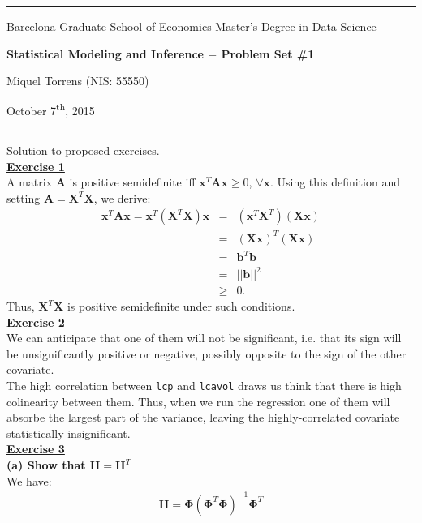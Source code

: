\documentclass[a4paper, 11pt]{article}
\newcommand{\header}[4]{
	\begin{center}
		\rule{\linewidth}{0.5pt}
		
		{\small{#1}}
      
        \vspace{0.2in}
        
		{\large{#2}}
		
        \vspace{0.2in}
        
		{\small{#3}}
		
		\vspace{0.15in}
		
		{#4}
		
		\vspace{-0.1in}
		\rule{\linewidth}{0.6pt}
	\end{center}
}
\begin{document}
 
\header{\sc Barcelona Graduate School of Economics \hfill Master's Degree in Data Science}{\bf Statistical Modeling and Inference $-$ Problem Set \#1}{\sc Miquel Torrens (NIS: 55550)}{October 7\textsuperscript{th}, 2015}
Solution to proposed exercises.\\
\newline \textbf{\underline{Exercise 1}}\\
\newline A matrix $\mathbf{A}$ is positive semidefinite iff $\mathbf{x}^T \mathbf{A} \mathbf{x} \geq 0$, $\forall \mathbf{x}$. Using this definition and setting $\mathbf{A} = \mathbf{X}^T \mathbf{X}$, we derive:
\begin{eqnarray}
\mathbf{x}^T \mathbf{A} \mathbf{x} = \mathbf{x}^T \left( \mathbf{X}^T \mathbf{X} \right) \mathbf{x} &=& \left( \mathbf{x}^T \mathbf{X}^T \right)  \left( \mathbf{X} \mathbf{x}  \right) \nonumber \\
&=& \left( \mathbf{X} \mathbf{x} \right)^T  \left( \mathbf{X} \mathbf{x}  \right) \nonumber \\
&=& \mathbf{b}^T \mathbf{b} \nonumber \\
&=& ||\mathbf{b}||^2 \nonumber \\
&\geq & 0. \nonumber
\end{eqnarray}
Thus, $ \mathbf{X}^T \mathbf{X}$ is positive semidefinite under such conditions.\\
\newline \textbf{\underline{Exercise 2}}\\
\newline We can anticipate that one of them will not be significant, i.e. that its sign will be unsignificantly positive or negative, possibly opposite to the sign of the other covariate.\\
\newline The high correlation between \texttt{lcp} and \texttt{lcavol} draws us think that there is high colinearity between them. Thus, when we run the regression one of them will absorbe the largest part of the variance, leaving the highly-correlated covariate statistically insignificant.\\
\newline \textbf{\underline{Exercise 3}}\\
\newline \textbf{(a) Show that $\mathbf{H} = \mathbf{H}^T$}\\
\newline We have:
\begin{eqnarray}
\mathbf{H} = \mathbf{\Phi} \left( \mathbf{\Phi}^T \mathbf{\Phi} \right)^{-1} \mathbf{\Phi}^T \nonumber
\end{eqnarray}
\end{document}
